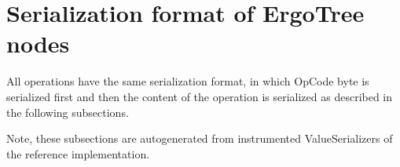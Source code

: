 \section{Serialization format of ErgoTree nodes}
\label{sec:appendix:ergotree_serialization}

All operations have the same serialization format, in which OpCode byte is serialized
first and then the content of the operation is serialized as described in the following
subsections.

Note, these subsections are autogenerated from instrumented ValueSerializers of the
reference implementation.


